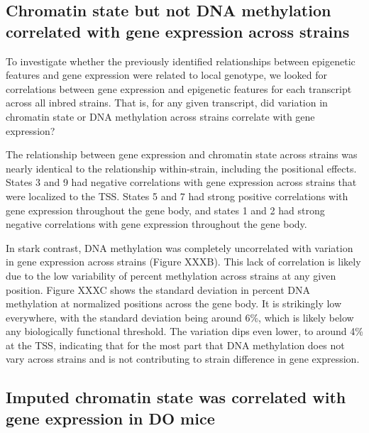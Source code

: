 \documentclass[10pt,letterpaper]{article}
\begin{document}
\hypertarget{chromatin-state-but-not-dna-methylation-correlated-with-gene-expression-across-strains}{%
\subsection{Chromatin state but not DNA methylation correlated with gene
expression across
strains}\label{chromatin-state-but-not-dna-methylation-correlated-with-gene-expression-across-strains}}

To investigate whether the previously identified relationships between
epigenetic features and gene expression were related to local genotype,
we looked for correlations between gene expression and epigenetic
features for each transcript across all inbred strains. That is, for any
given transcript, did variation in chromatin state or DNA methylation
across strains correlate with gene expression?

The relationship between gene expression and chromatin state across
strains was nearly identical to the relationship within-strain,
including the positional effects. States 3 and 9 had negative
correlations with gene expression across strains that were localized to
the TSS. States 5 and 7 had strong positive correlations with gene
expression throughout the gene body, and states 1 and 2 had strong
negative correlations with gene expression throughout the gene body.

In stark contrast, DNA methylation was completely uncorrelated with
variation in gene expression across strains (Figure XXXB). This lack of
correlation is likely due to the low variability of percent methylation
across strains at any given position. Figure XXXC shows the standard
deviation in percent DNA methylation at normalized positions across the
gene body. It is strikingly low everywhere, with the standard deviation
being around 6\%, which is likely below any biologically functional
threshold. The variation dips even lower, to around 4\% at the TSS,
indicating that for the most part that DNA methylation does not vary
across strains and is not contributing to strain difference in gene
expression.

\hypertarget{imputed-chromatin-state-was-correlated-with-gene-expression-in-do-mice}{%
\subsection{Imputed chromatin state was correlated with gene expression
in DO
mice}\label{imputed-chromatin-state-was-correlated-with-gene-expression-in-do-mice}}
\end{document}
